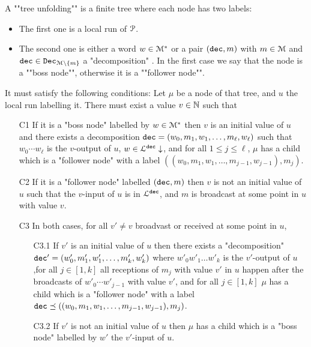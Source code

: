 \begin{definition}
	A ""tree unfolding"" is
	a finite tree where each node has two labels:
	\begin{itemize}
		\item The first one is a local run of $\mathcal{P}$. 
		
		\item The second one is either a word $w \in \mathcal{M}^*$ or a pair $(\mathtt{dec}, m)$ with $m \in \mathcal{M}$ and $\mathtt{dec} \in \mathtt{Dec}_{\mathcal{M}\setminus\{m\}}$ a "decomposition" . In the first case we say that the node is a ""boss node"", otherwise it is a ""follower node"". 
	\end{itemize} 
	
	It must satisfy the following conditions:
	Let $\mu$ be a node of that tree, and $u$ the local run labelling it. There must exist a value $v \in \mathbb{N}$ such that
	
	\begin{itemize}
		\item[C1] If it is a "boss node" labelled by $w \in \mathcal{M}^*$ then $v$ is an initial value of $u$ and there exists a decomposition $\mathtt{dec} = (w_0, m_1, w_1, \ldots, m_{\ell}, w_{\ell})$ such that
	 $w_0 \cdots w_\ell$ is the $v$-output of $u$, $w \in \mathcal{L}^{\mathtt{\mathtt{dec}}}\downarrow$, and for all $1 \leq j \leq \ell$, $\mu$ has a child which is a "follower node" with a label $((w_0, m_1, w_1, \ldots, m_{j-1}, w_{j-1}), m_j)$.
		
		\item[C2] If it is a "follower node" labelled $(\mathtt{dec}, m)$ then $v$ is not an initial value of $u$ such that the $v$-input of $u$ is in $\mathcal{L}^{\mathtt{\mathtt{dec}}}$, and $m$ is broadcast at some point in $u$ with value $v$.
		
		\item[C3] In both cases, for all $v' \neq v$ broadvast or received at some point in $u$,
		\begin{itemize}
			\item[C3.1] If $v'$ is an initial value of $u$ then there exists a "decomposition" $\mathtt{dec}' = (w'_0, m'_1, w'_1, \ldots, m'_k, w'_k)$ where $w'_0 w'_1 \ldots w'_k$ is the $v'$-output of $u$,for all $j \in [1,k]$ all receptions of $m_j$ with value $v'$ in $u$ happen after the broadcasts of $w'_0\cdots w'_{j-1}$ with value $v'$, and for all $j \in [1,k]$ $\mu$ has a child which is a "follower node" with a label $\mathtt{dec} \preceq ((w_0, m_1, w_1, \ldots, m_{j-1}, w_{j-1}), m_j)$.  
			
			\item[C3.2] If $v'$ is not an initial value of $u$ then $\mu$ has a child which is a "boss node" labelled by $w'$ the $v'$-input of $u$.
		\end{itemize}
	\end{itemize}
	
	
\end{definition}


